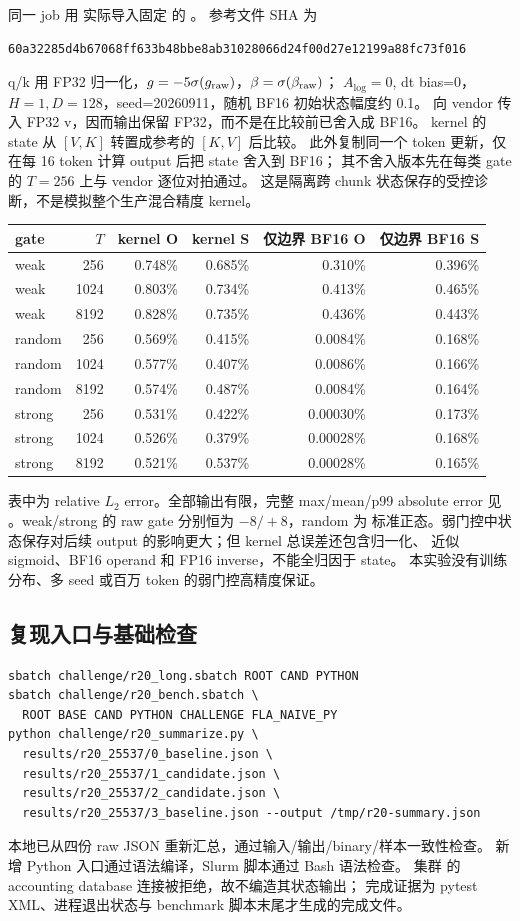 同一 job 用  实际导入固定
 的 。
参考文件 SHA 为
\begin{lstlisting}
60a32285d4b67068ff633b48bbe8ab31028066d24f00d27e12199a88fc73f016
\end{lstlisting}
q/k 用 FP32 归一化，$g=-5\sigma(g_{\rm raw})$，$\beta=\sigma(\beta_{\rm raw})$；
$A_{\log}=0$, dt bias=0，$H=1,D=128$，seed=20260911，随机 BF16 初始状态幅度约 0.1。
向 vendor 传入 FP32 v，因而输出保留 FP32，而不是在比较前已舍入成 BF16。
kernel 的 state 从 $[V,K]$ 转置成参考的 $[K,V]$ 后比较。
此外复制同一个 token 更新，仅在每 16 token 计算 output 后把 state 舍入到 BF16；
其不舍入版本先在每类 gate 的 $T=256$ 上与 vendor 逐位对拍通过。
这是隔离跨 chunk 状态保存的受控诊断，不是模拟整个生产混合精度 kernel。

\begin{center}\small
\begin{tabular}{@{}lrrrrr@{}}\toprule
gate&$T$&kernel O&kernel S&仅边界 BF16 O&仅边界 BF16 S\\\midrule
weak&256&0.748\%&0.685\%&0.310\%&0.396\%\\
weak&1024&0.803\%&0.734\%&0.413\%&0.465\%\\
weak&8192&0.828\%&0.735\%&0.436\%&0.443\%\\
random&256&0.569\%&0.415\%&0.0084\%&0.168\%\\
random&1024&0.577\%&0.407\%&0.0086\%&0.166\%\\
random&8192&0.574\%&0.487\%&0.0084\%&0.164\%\\
strong&256&0.531\%&0.422\%&0.00030\%&0.173\%\\
strong&1024&0.526\%&0.379\%&0.00028\%&0.168\%\\
strong&8192&0.521\%&0.537\%&0.00028\%&0.165\%\\\bottomrule
\end{tabular}
\end{center}
表中为 relative $L_2$ error。全部输出有限，完整 max/mean/p99 absolute error
见 。weak/strong 的 raw gate 分别恒为 $-8/+8$，random 为
标准正态。弱门控中状态保存对后续 output 的影响更大；但 kernel 总误差还包含归一化、
近似 sigmoid、BF16 operand 和 FP16 inverse，不能全归因于 state。
本实验没有训练分布、多 seed 或百万 token 的弱门控高精度保证。

\subsection{复现入口与基础检查}
\begin{lstlisting}
sbatch challenge/r20_long.sbatch ROOT CAND PYTHON
sbatch challenge/r20_bench.sbatch \
  ROOT BASE CAND PYTHON CHALLENGE FLA_NAIVE_PY
python challenge/r20_summarize.py \
  results/r20_25537/0_baseline.json \
  results/r20_25537/1_candidate.json \
  results/r20_25537/2_candidate.json \
  results/r20_25537/3_baseline.json --output /tmp/r20-summary.json
\end{lstlisting}
本地已从四份 raw JSON 重新汇总，通过输入/输出/binary/样本一致性检查。
新增 Python 入口通过语法编译，Slurm 脚本通过 Bash 语法检查。
集群 \code{sacct} 的 accounting database 连接被拒绝，故不编造其状态输出；
完成证据为 pytest XML、进程退出状态与 benchmark 脚本末尾才生成的完成文件。

